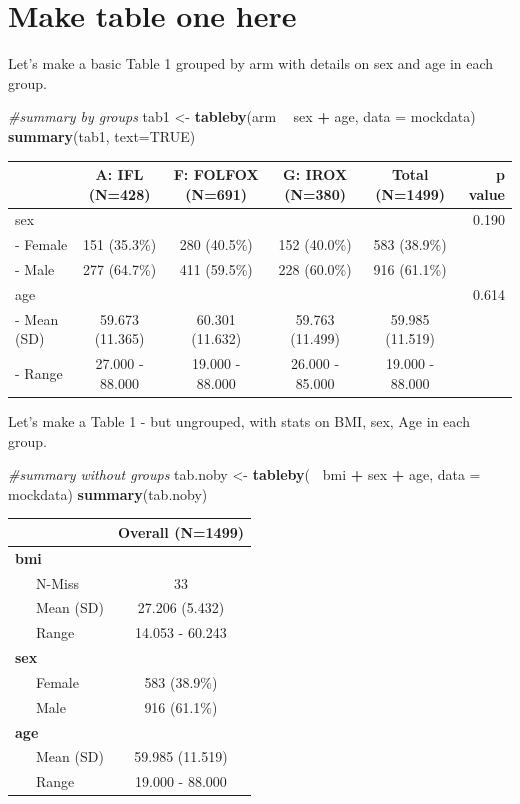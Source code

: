 \documentclass[fleqn,10pt,lineno]{wlpeerj} %
\newenvironment{Shaded}{\begin{snugshade}}{\end{snugshade}}
\newcommand{\CommentTok}[1]{\textcolor[rgb]{0.56,0.35,0.01}{\textit{#1}}}
\newcommand{\DataTypeTok}[1]{\textcolor[rgb]{0.13,0.29,0.53}{#1}}
\newcommand{\KeywordTok}[1]{\textcolor[rgb]{0.13,0.29,0.53}{\textbf{#1}}}
\newcommand{\NormalTok}[1]{#1}
\newcommand{\OperatorTok}[1]{\textcolor[rgb]{0.81,0.36,0.00}{\textbf{#1}}}
\newcommand{\OtherTok}[1]{\textcolor[rgb]{0.56,0.35,0.01}{#1}}
\newcommand{\StringTok}[1]{\textcolor[rgb]{0.31,0.60,0.02}{#1}}
\begin{document}
\hypertarget{make-table-one-here}{%
\section{Make table one here}\label{make-table-one-here}}

Let's make a basic Table 1 grouped by arm with details on sex and age in each group.

\begin{Shaded}
\begin{Highlighting}[]
\CommentTok{#summary by groups}
\NormalTok{tab1 <-}\StringTok{ }\KeywordTok{tableby}\NormalTok{(arm }\OperatorTok{~}\StringTok{ }\NormalTok{sex }\OperatorTok{+}\StringTok{ }\NormalTok{age, }\DataTypeTok{data =}\NormalTok{ mockdata)}
\KeywordTok{summary}\NormalTok{(tab1, }\DataTypeTok{text=}\OtherTok{TRUE}\NormalTok{)}
\end{Highlighting}
\end{Shaded}

\begin{longtable}[]{@{}lccccr@{}}
\toprule
& A: IFL (N=428) & F: FOLFOX (N=691) & G: IROX (N=380) & Total (N=1499) & p value\tabularnewline
\midrule
\endhead
sex & & & & & 0.190\tabularnewline
- Female & 151 (35.3\%) & 280 (40.5\%) & 152 (40.0\%) & 583 (38.9\%) &\tabularnewline
- Male & 277 (64.7\%) & 411 (59.5\%) & 228 (60.0\%) & 916 (61.1\%) &\tabularnewline
age & & & & & 0.614\tabularnewline
- Mean (SD) & 59.673 (11.365) & 60.301 (11.632) & 59.763 (11.499) & 59.985 (11.519) &\tabularnewline
- Range & 27.000 - 88.000 & 19.000 - 88.000 & 26.000 - 85.000 & 19.000 - 88.000 &\tabularnewline
\bottomrule
\end{longtable}

Let's make a Table 1 - but ungrouped, with stats on BMI, sex, Age in each group.

\begin{Shaded}
\begin{Highlighting}[]
\CommentTok{#summary without groups}
\NormalTok{tab.noby <-}\StringTok{ }\KeywordTok{tableby}\NormalTok{(}\OperatorTok{~}\StringTok{ }\NormalTok{bmi }\OperatorTok{+}\StringTok{ }\NormalTok{sex }\OperatorTok{+}\StringTok{ }\NormalTok{age, }\DataTypeTok{data =}\NormalTok{ mockdata)}
\KeywordTok{summary}\NormalTok{(tab.noby)}
\end{Highlighting}
\end{Shaded}

\begin{longtable}[]{@{}lc@{}}
\toprule
& Overall (N=1499)\tabularnewline
\midrule
\endhead
\textbf{bmi} &\tabularnewline
~~~N-Miss & 33\tabularnewline
~~~Mean (SD) & 27.206 (5.432)\tabularnewline
~~~Range & 14.053 - 60.243\tabularnewline
\textbf{sex} &\tabularnewline
~~~Female & 583 (38.9\%)\tabularnewline
~~~Male & 916 (61.1\%)\tabularnewline
\textbf{age} &\tabularnewline
~~~Mean (SD) & 59.985 (11.519)\tabularnewline
~~~Range & 19.000 - 88.000\tabularnewline
\bottomrule
\end{longtable}
\end{document}
